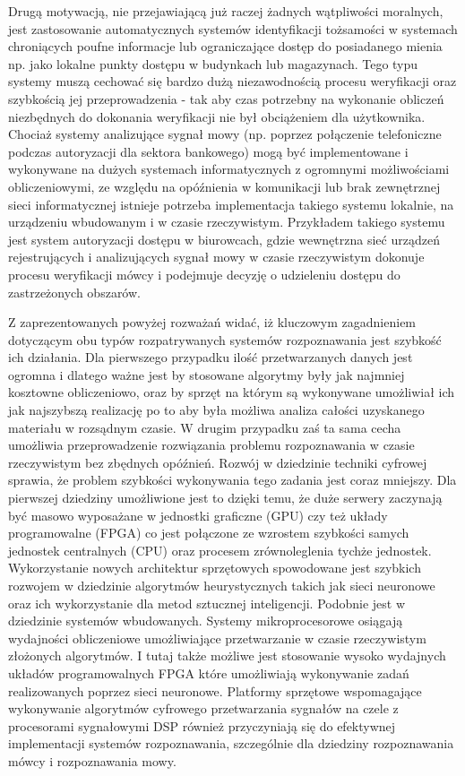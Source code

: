 Drugą motywacją, nie przejawiającą już raczej żadnych wątpliwości moralnych, jest zastosowanie automatycznych systemów identyfikacji tożsamości w systemach chroniących poufne informacje lub ograniczające dostęp do posiadanego mienia np. jako lokalne punkty dostępu w budynkach lub magazynach. Tego typu systemy muszą cechować się bardzo dużą niezawodnością procesu weryfikacji oraz szybkością jej przeprowadzenia - tak aby czas potrzebny na wykonanie obliczeń niezbędnych do dokonania weryfikacji nie był obciążeniem dla użytkownika. Chociaż systemy analizujące sygnał mowy (np. poprzez połączenie telefoniczne podczas autoryzacji dla sektora bankowego) mogą być implementowane i wykonywane na dużych systemach informatycznych z ogromnymi możliwościami obliczeniowymi, ze względu na opóźnienia w komunikacji lub brak zewnętrznej sieci informatycznej istnieje potrzeba implementacja takiego systemu lokalnie, na urządzeniu wbudowanym i w czasie rzeczywistym. Przykładem takiego systemu jest system autoryzacji dostępu w biurowcach, gdzie wewnętrzna sieć urządzeń rejestrujących i analizujących sygnał mowy w czasie rzeczywistym dokonuje procesu weryfikacji mówcy i podejmuje decyzję o udzieleniu dostępu do zastrzeżonych obszarów.

Z zaprezentowanych powyżej rozważań widać, iż kluczowym zagadnieniem dotyczącym obu typów rozpatrywanych systemów rozpoznawania jest szybkość ich działania. Dla pierwszego przypadku ilość przetwarzanych danych jest ogromna i dlatego ważne jest by stosowane algorytmy były jak najmniej kosztowne obliczeniowo, oraz by sprzęt na którym są wykonywane umożliwiał ich jak najszybszą realizację po to aby była możliwa analiza całości uzyskanego materiału w rozsądnym czasie. W drugim przypadku zaś ta sama cecha umożliwia przeprowadzenie rozwiązania problemu rozpoznawania w czasie rzeczywistym bez zbędnych opóźnień. Rozwój w dziedzinie techniki cyfrowej sprawia, że problem szybkości wykonywania tego zadania jest coraz mniejszy. Dla pierwszej dziedziny umożliwione jest to dzięki temu, że duże serwery zaczynają być masowo wyposażane w jednostki graficzne (GPU) czy też układy programowalne (FPGA) co jest połączone ze wzrostem szybkości samych jednostek centralnych (CPU) oraz procesem zrównoleglenia tychże jednostek. Wykorzystanie nowych architektur sprzętowych spowodowane jest szybkich rozwojem w dziedzinie algorytmów heurystycznych takich jak sieci neuronowe oraz ich wykorzystanie dla metod sztucznej inteligencji. Podobnie jest w dziedzinie systemów wbudowanych. Systemy mikroprocesorowe osiągają wydajności obliczeniowe umożliwiające przetwarzanie w czasie rzeczywistym złożonych algorytmów. I tutaj także możliwe jest stosowanie wysoko wydajnych układów programowalnych FPGA które umożliwiają wykonywanie zadań realizowanych poprzez sieci neuronowe. Platformy sprzętowe wspomagające wykonywanie algorytmów cyfrowego przetwarzania sygnałów na czele z procesorami sygnałowymi DSP również przyczyniają się do efektywnej implementacji systemów rozpoznawania, szczególnie dla dziedziny rozpoznawania mówcy i rozpoznawania mowy.

